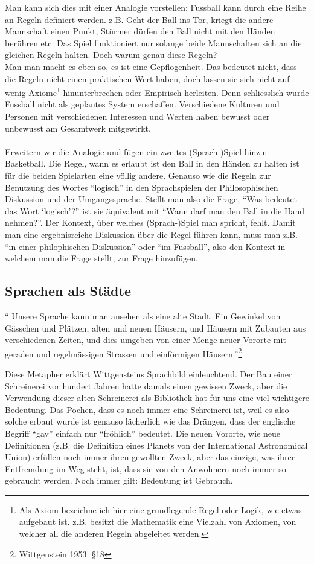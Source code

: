 \documentclass[10pt,a4paper]{article}
\begin{document}
Man kann sich dies mit einer Analogie vorstellen: Fussball kann durch eine Reihe an Regeln definiert werden. z.B. Geht der Ball ins Tor, kriegt die andere Mannschaft einen Punkt, Stürmer dürfen den Ball nicht mit den Händen berühren etc. Das Spiel funktioniert nur solange beide Mannschaften sich an die gleichen Regeln halten. Doch warum genau diese Regeln? \\ Man man macht es eben so, es ist eine Gepflogenheit. Das bedeutet nicht, dass die Regeln nicht einen praktischen Wert haben, doch lassen sie sich nicht auf wenig Axiome\footnote{Als Axiom bezeichne ich hier eine grundlegende Regel oder Logik, wie etwas aufgebaut ist. z.B. besitzt die Mathematik eine Vielzahl von Axiomen, von welcher all die anderen Regeln abgeleitet werden.} hinunterbrechen oder Empirisch herleiten. Denn schliesslich wurde Fussball nicht als geplantes System erschaffen. Verschiedene Kulturen und Personen mit verschiedenen Interessen und Werten haben bewusst oder unbewusst am Gesamtwerk mitgewirkt. \\
\\
Erweitern wir die Analogie und fügen ein zweites (Sprach-)Spiel hinzu: Basketball. Die Regel, wann es erlaubt ist den Ball in den Händen zu halten ist für die beiden Spielarten eine völlig andere. Genauso wie die Regeln zur Benutzung des Wortes \enquote{logisch} in den Sprachspielen der Philosophischen Diskussion und der Umgangssprache. Stellt man also die Frage, \enquote{Was bedeutet das Wort \enquote{logisch}?} ist sie äquivalent mit \enquote{Wann darf man den Ball in die Hand nehmen?}. Der Kontext, über welches (Sprach-)Spiel man spricht, fehlt. Damit man eine ergebnisreiche Diskussion über die Regel führen kann, muss man z.B. \enquote{in einer philophischen Diskussion} oder \enquote{im Fussball}, also den Kontext in welchem man die Frage stellt, zur Frage hinzufügen.

\subsection{Sprachen als Städte}
\begin{displayquote}
\enquote{
Unsere Sprache kann man ansehen als eine alte Stadt: Ein Gewinkel von Gässchen und Plätzen, alten und neuen Häusern, und Häusern mit Zubauten aus verschiedenen Zeiten, und dies umgeben von einer Menge neuer Vororte mit geraden und regelmässigen Strassen und einförmigen Häusern.}\footnote{Wittgenstein 1953: §18}
\end{displayquote}
Diese Metapher erklärt Wittgensteins Sprachbild einleuchtend. Der Bau einer Schreinerei vor hundert Jahren hatte damals einen gewissen Zweck, aber die Verwendung dieser alten Schreinerei als Bibliothek hat für uns eine viel wichtigere Bedeutung. Das Pochen, dass es noch immer eine Schreinerei ist, weil es also solche erbaut wurde ist genauso lächerlich wie das Drängen, dass der englische Begriff \enquote{gay} einfach nur \enquote{fröhlich} bedeutet. Die neuen Vororte, wie neue Definitionen (z.B. die Definition eines Planets von der International Astronomical Union) erfüllen noch immer ihren gewollten Zweck, aber das einzige, was ihrer Entfremdung im Weg steht, ist, dass sie von den Anwohnern noch immer so gebraucht werden. Noch immer gilt: Bedeutung ist Gebrauch.
\end{document}
